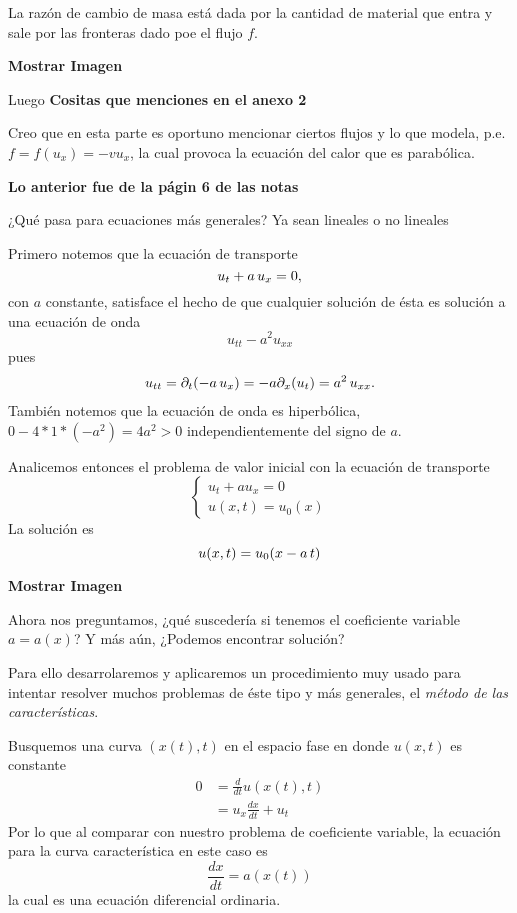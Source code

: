 La razón de cambio de masa está dada por la cantidad de material que entra y sale por las fronteras dado poe el flujo $f$.

\textbf{Mostrar Imagen}

Luego
\textbf{Cositas que menciones en el anexo 2} 

Creo que en esta parte es oportuno mencionar ciertos flujos y lo que modela, p.e. $f=f(u_x) = -v u_x$, la cual provoca la ecuación del calor que es parabólica.

\textbf{Lo anterior fue de la págin 6 de las notas}

¿Qué pasa para ecuaciones más generales? Ya sean lineales o no lineales

Primero notemos que la ecuación de transporte
\[
u_t + a \thinspace u_x = 0,
\]
con $a$ constante, satisface el hecho de que cualquier solución de ésta es solución a una ecuación de onda
\[
u_{tt} - a^2 u_{xx}
\]
pues 
\begin{align*}
u_{tt} = \partial_t (-a \thinspace u_x) = -a \partial_x (u_t) = a^2 \thinspace u_{xx}.
\end{align*}
También notemos que la ecuación de onda es hiperbólica, $0-4*1*(-a^2) = 4a^2>0$ independientemente del signo de $a$.

Analicemos entonces el problema de valor inicial con la ecuación de transporte
\[
\begin{cases}
u_t + au_x = 0	\\
u(x,t) = u_0(x)
\end{cases}
\]
La solución es
\[
u(x,t) = u_0(x-a\thinspace t)
\]

\textbf{Mostrar Imagen}

Ahora nos preguntamos, ¿qué suscedería si tenemos el coeficiente variable $a=a(x)$? Y más aún, ¿Podemos encontrar solución?

Para ello desarrolaremos y aplicaremos un procedimiento muy usado para intentar resolver muchos problemas de éste tipo y más generales, el \textit{método de las características}.

Busquemos una curva $(x(t), t)$ en el espacio fase en donde $u(x,t)$ es constante
\begin{align*}
0 &= \frac{d}{d t} u(x(t), t) \\
  &= u_x \frac{dx}{dt} + u_t
\end{align*}
Por lo que al comparar con nuestro problema de coeficiente variable, la ecuación para la curva característica en este caso es
\[
\frac{dx}{dt} = a(x(t))
\]
la cual es una ecuación diferencial ordinaria.

